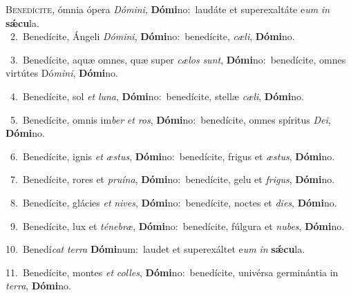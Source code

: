\lettrine{\initial\textcolor{\initialcolor}{B}}{enedícite,} ómnia ópera \textit{Dó}\-\textit{mi}\textit{ni}, \textbf{Dó}\-\textbf{mi}no:~\star laudáte et superexaltáte e\textit{um} \textit{in} \textbf{sǽ}\-\textbf{cu}la.\\
{\numbfont\textcolor{\numbcolor}{~2.}}~Benedícite, Ángeli \textit{Dó}\-\textit{mi}\textit{ni}, \textbf{Dó}\-\textbf{mi}no:~\star benedícite, \textit{cæ}\-\textit{li}, \textbf{Dó}\-\textbf{mi}no.\par
{\numbfont\textcolor{\numbcolor}{~3.}}~Benedícite, aquæ omnes, quæ super \textit{cæ}\-\textit{los} \textit{sunt}\-, \textbf{Dó}\-\textbf{mi}no:~\star benedícite, omnes virtútes Dó\-\textit{mi}\-\textit{ni}, \textbf{Dó}\-\textbf{mi}no.\par
{\numbfont\textcolor{\numbcolor}{~4.}}~Benedícite, sol \textit{et} \textit{lu}\-\textit{na}, \textbf{Dó}\-\textbf{mi}no:~\star benedícite, stellæ \textit{cæ}\-\textit{li}, \textbf{Dó}\-\textbf{mi}no.\par
{\numbfont\textcolor{\numbcolor}{~5.}}~Benedícite, omnis im\textit{ber} \textit{et} \textit{ros}\-, \textbf{Dó}\-\textbf{mi}no:~\star benedícite, omnes spíritus \textit{De}\-\textit{i}, \textbf{Dó}\-\textbf{mi}no.\par
{\numbfont\textcolor{\numbcolor}{~6.}}~Benedícite, ignis \textit{et} \textit{æs}\-\textit{tus}, \textbf{Dó}\-\textbf{mi}no:~\star benedícite, frigus et \textit{æs}\-\textit{tus}, \textbf{Dó}\-\textbf{mi}no.\par
{\numbfont\textcolor{\numbcolor}{~7.}}~Benedícite, rores et \textit{pru}\-\textit{í}\textit{na}, \textbf{Dó}\-\textbf{mi}no:~\star benedícite, gelu et \textit{fri}\-\textit{gus}, \textbf{Dó}\-\textbf{mi}no.\par
{\numbfont\textcolor{\numbcolor}{~8.}}~Benedícite, glácies \textit{et} \textit{ni}\-\textit{ves}, \textbf{Dó}\-\textbf{mi}no:~\star benedícite, noctes et \textit{di}\-\textit{es}, \textbf{Dó}\-\textbf{mi}no.\par
{\numbfont\textcolor{\numbcolor}{~9.}}~Benedícite, lux et \textit{té}\-\textit{ne}\textit{bræ}, \textbf{Dó}\-\textbf{mi}no:~\star benedícite, fúlgura et \textit{nu}\-\textit{bes}, \textbf{Dó}\-\textbf{mi}no.\par
{\numbfont\textcolor{\numbcolor}{10.}}~Benedí\textit{cat} \textit{ter}\-\textit{ra} \textbf{Dó}\-\textbf{mi}num:~\star laudet et superexáltet e\textit{um} \textit{in} \textbf{sǽ}\-\textbf{cu}la.\par
{\numbfont\textcolor{\numbcolor}{11.}}~Benedícite, montes \textit{et} \textit{col}\-\textit{les}, \textbf{Dó}\-\textbf{mi}no:~\star benedícite, univérsa germinántia in \textit{ter}\-\textit{ra}, \textbf{Dó}\-\textbf{mi}no.\par
